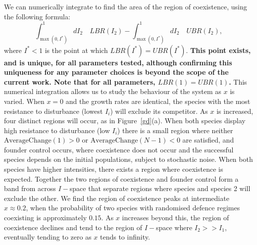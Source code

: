 \documentclass[preprint,10pt,reqno]{report}
\begin{document}
We can numerically integrate to find the area of the region of coexistence, using the following formula:
\begin{equation}
\int_{\max(0,I^*)}^1 dI_2\quad LBR(I_2) - \int_{\max(0,I^*)}^1 dI_2\quad UBR(I_2),
\end{equation}
where $I^*<1$ is the point at which $LBR(I^*)=UBR(I^*)$. \textbf{This point exists, and is unique, for all parameters tested, although confirming this uniqueness for any parameter choices is beyond the scope of the current work. Note that for all parameters, $LBR(1)=UBR(1)$.} This numerical integration allows us to study the behaviour of the system as $x$ is varied. When $x=0$ and the growth rates are identical, the species with the most resistance to disturbance (lowest $I_i$) will exclude its competitor.  As $x$ is increased, four distinct regions will occur, as in Figure~\ref{gd}(a). When both species display high resistance to disturbance (low $I_i$) there is a small region where neither $\text{AverageChange}(1)>0$ or $\text{AverageChange}(N-1)<0$ are satisfied, and founder control occurs, where coexistence does not occur and the successful species depends on the initial populations, subject to stochastic noise. When both species have higher intensities, there exists a region where coexistence is expected. Together the two regions of coexistence and founder control form a band from across $I-$space that separate regions where species and species 2 will exclude the other. We find the region of coexistence peaks at intermediate $x \approx 0.2$, when the probability of two species with randomised defence regimes coexisting is approximately $0.15$. As $x$ increases beyond this, the region of coexistence declines and tend to the region of $I-$space where $I_2>>I_1$, eventually tending to zero as $x$ tends to infinity.
\end{document}
